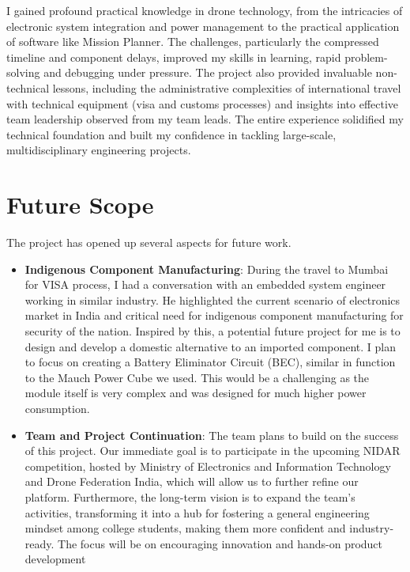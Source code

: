 I gained profound practical knowledge in drone technology, from the intricacies of electronic system integration and power management to the practical application of software like Mission Planner. The challenges, particularly the compressed timeline and component delays, improved my skills in learning, rapid problem-solving and debugging under pressure. The project also provided invaluable non-technical lessons, including the administrative complexities of international travel with technical equipment (visa and customs processes) and insights into effective team leadership observed from my team leads. The entire experience solidified my technical foundation and built my confidence in tackling large-scale, multidisciplinary engineering projects.


\section{Future Scope}

The project has opened up several aspects for future work.

\begin{itemize}
	\item \textbf{Indigenous Component Manufacturing}:
During the travel to Mumbai for VISA process, I had a conversation with an embedded system engineer working in similar industry. He highlighted the current scenario of electronics market in India and critical need for indigenous component manufacturing for security of the nation. Inspired by this, a potential future project for me is to design and develop a domestic alternative to an imported component. I plan to focus on creating a Battery Eliminator Circuit (BEC), similar in function to the Mauch Power Cube we used. This would be a challenging as the module itself is very complex and was designed for much higher power consumption.

\item \textbf{Team and Project Continuation}:
The team plans to build on the success of this project. Our immediate goal is to participate in the upcoming NIDAR competition, hosted by Ministry of Electronics and Information Technology and Drone Federation India, which will allow us to further refine our platform. Furthermore, the long-term vision is to expand the team's activities, transforming it into a hub for fostering a general engineering mindset among college students, making them more confident and industry-ready. The focus will be on encouraging innovation and hands-on product development
\end{itemize}
